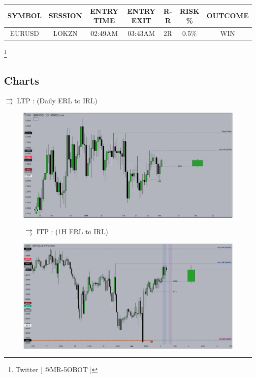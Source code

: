 \documentclass{article}
\begin{document}
\vspace{0.5cm}
\begin{center}
\begin{tabular}{|c|c|c|c|c|c|c|}
  \hline
  SYMBOL & SESSION & ENTRY TIME & ENTRY EXIT & R-R & RISK \% & OUTCOME \\ 
  \hline 
  EURUSD & LOKZN & 02:49AM & 03:43AM & 2R & 0.5\% & WIN \\  
  \hline
\end{tabular}
\end{center}
\vspace{1cm}

\footnote{Twitter [ @MR-5OBOT ]}

\subsection{Charts}
\vspace{0.4cm}

\( \rightrightarrows \) \hspace{0.1cm}LTP : (Daily ERL to IRL)

\begin{figure}[h]
  \begin{center}
    \includegraphics[scale=1.4]{./figures/GU_daily.png}
  \end{center}

\( \rightrightarrows \) \hspace{0.1cm}ITP : (1H ERL to IRL)

  \begin{center}
    \includegraphics[scale=1.4]{./figures/GU_1H.png}
  \end{center}
\end{figure}
\end{document}
